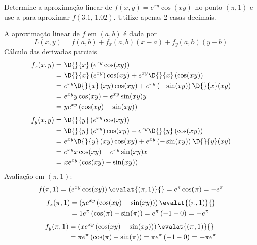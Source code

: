 \documentclass[a4paper,12pt,fleqn]{article}
\begin{document}

Determine a aproximação linear
de \(f(x, y) = e^{xy}\cos(xy)\) no ponto \((\pi, 1)\) e
use-a para aproximar \(f(3.1,\,1.02)\).
Utilize apenas 2 casas decimais.
\clearpagequestiononly

\begin{answer}
A aproximação linear de \(f\) em \((a, b)\) é dada por
\[
  L(x, y) = f(a, b) + f_x(a, b)(x-a) + f_y(a, b)(y-b)
\]
Cálculo das derivadas parciais
\begin{align*}
  f_x(x, y)
  & = \D{}{x}\left(e^{xy}\cos(xy)\right) \\
  & = \D{}{x}\left(e^{xy}\right) \cos(xy)
    + e^{xy} \D{}{x}\left(\cos(xy)\right) \\
  & = e^{xy}\D{}{x}\left(xy\right) \cos(xy)
      + e^{xy} \left(-\sin(xy)\right)\D{}{x}(xy) \\
  & = e^{xy}y \cos(xy) - e^{xy} \sin(xy)y \\
  & = ye^{xy}\left(\cos(xy)-\sin(xy)\right)
\end{align*}
\begin{align*}
  f_y(x, y)
  & = \D{}{y}\left(e^{xy}\cos(xy)\right) \\
  & = \D{}{y}\left(e^{xy}\right) \cos(xy)
    + e^{xy} \D{}{y}\left(\cos(xy)\right) \\
  & = e^{xy}\D{}{y}\left(xy\right) \cos(xy)
      + e^{xy} \left(-\sin(xy)\right)\D{}{y}(xy) \\
  & = e^{xy}x \cos(xy) - e^{xy} \sin(xy)x \\
  & = xe^{xy}\left(\cos(xy)-\sin(xy)\right)
\end{align*}
Avaliação em \((\pi, 1)\):
\[
    f(\pi, 1)
    = \left(e^{xy}\cos(xy)\right)\evalat{(\pi, 1)}{}
    = e^\pi\cos(\pi)
    = -e^\pi
\]
\begin{align*}
    f_x(\pi, 1)
    & = \left(ye^{xy}\left(\cos(xy)-\sin(xy)\right)\right)\evalat{(\pi, 1)}{} \\
    & = 1e^\pi\left(\cos(\pi)-\sin(\pi)\right)
    = e^\pi\left(-1-0\right)
    = -e^\pi
\end{align*}
\begin{align*}
    f_y(\pi, 1)
    & = \left(xe^{xy}\left(\cos(xy)-\sin(xy)\right)\right)\evalat{(\pi, 1)}{} \\
    & = \pi e^\pi\left(\cos(\pi)-\sin(\pi)\right)
    = \pi e^\pi\left(-1-0\right)
    = -\pi e^\pi
\end{align*}

\end{answer}
\end{document}
